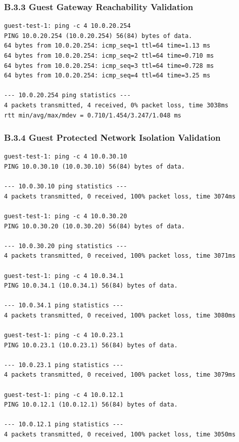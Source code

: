\documentclass[11pt]{article}
\begin{document}
\subsubsection{B.3.3 Guest Gateway Reachability Validation}
\label{sec:appendix-b-guest-gateway-reachability-validation}

\begin{verbatim}
guest-test-1: ping -c 4 10.0.20.254
PING 10.0.20.254 (10.0.20.254) 56(84) bytes of data.
64 bytes from 10.0.20.254: icmp_seq=1 ttl=64 time=1.13 ms
64 bytes from 10.0.20.254: icmp_seq=2 ttl=64 time=0.710 ms
64 bytes from 10.0.20.254: icmp_seq=3 ttl=64 time=0.728 ms
64 bytes from 10.0.20.254: icmp_seq=4 ttl=64 time=3.25 ms

--- 10.0.20.254 ping statistics ---
4 packets transmitted, 4 received, 0% packet loss, time 3038ms
rtt min/avg/max/mdev = 0.710/1.454/3.247/1.048 ms
\end{verbatim}


\subsubsection{B.3.4 Guest Protected Network Isolation Validation}
\label{sec:appendix-b-guest-protected-network-isolation-validation}

\begin{verbatim}
guest-test-1: ping -c 4 10.0.30.10
PING 10.0.30.10 (10.0.30.10) 56(84) bytes of data.

--- 10.0.30.10 ping statistics ---
4 packets transmitted, 0 received, 100% packet loss, time 3074ms

guest-test-1: ping -c 4 10.0.30.20
PING 10.0.30.20 (10.0.30.20) 56(84) bytes of data.

--- 10.0.30.20 ping statistics ---
4 packets transmitted, 0 received, 100% packet loss, time 3071ms

guest-test-1: ping -c 4 10.0.34.1
PING 10.0.34.1 (10.0.34.1) 56(84) bytes of data.

--- 10.0.34.1 ping statistics ---
4 packets transmitted, 0 received, 100% packet loss, time 3080ms

guest-test-1: ping -c 4 10.0.23.1
PING 10.0.23.1 (10.0.23.1) 56(84) bytes of data.

--- 10.0.23.1 ping statistics ---
4 packets transmitted, 0 received, 100% packet loss, time 3079ms

guest-test-1: ping -c 4 10.0.12.1
PING 10.0.12.1 (10.0.12.1) 56(84) bytes of data.

--- 10.0.12.1 ping statistics ---
4 packets transmitted, 0 received, 100% packet loss, time 3050ms
\end{verbatim}
\end{document}
